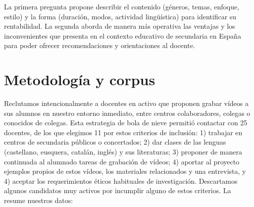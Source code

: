 \documentclass[spanish]{textolivre}
\begin{document}
La primera pregunta propone describir el contenido (géneros, temas, enfoque, estilo) y la forma (duración, modos, actividad lingüística) para identificar su rentabilidad. La segunda aborda de manera más operativa las ventajas y los inconvenientes que presenta en el contexto educativo de secundaria en España para poder ofrecer recomendaciones y orientaciones al docente.


\section{Metodología y corpus}\label{sec-fmt-manuscrito}
Reclutamos intencionalmente a docentes en activo que proponen grabar vídeos a sus alumnos en nuestro entorno inmediato, entre centros colaboradores, colegas o conocidos de colegas. Esta estrategia de bola de nieve permitió contactar con 25 docentes, de los que elegimos 11 por estos criterios de inclusión: 1) trabajar en centros de secundaria públicos o concertados; 2) dar clases de las lenguas (castellano, eusquera, catalán, inglés) y sus literaturas; 3) proponer de manera continuada al alumnado tareas de grabación de vídeos; 4) aportar al proyecto ejemplos propios de estos vídeos, los materiales relacionados y una entrevista, y 4) aceptar los requerimientos éticos habituales de investigación. Descartamos algunos candidatos muy activos por incumplir alguno de estos criterios. La  resume nuestros datos:
\end{document}
